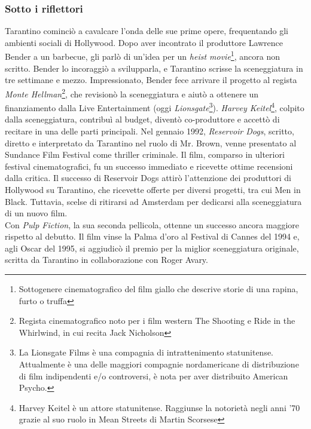 \documentclass[12pt]{article} %
\begin{document}
\subsubsection{Sotto i riflettori}
\begin{flushleft}
    Tarantino cominciò a cavalcare l'onda delle sue prime opere, frequentando gli ambienti sociali di Hollywood.
    Dopo aver incontrato il produttore Lawrence Bender a un barbecue, gli parlò di un'idea 
    per un \textit{heist movie}\footnote{Sottogenere cinematografico del film giallo che descrive storie di una rapina, furto o truffa}, ancora non scritto. 
    Bender lo incoraggiò a svilupparla, e Tarantino scrisse la sceneggiatura in tre settimane e mezzo.
    Impressionato, Bender fece arrivare il progetto al regista \textit{Monte Hellman}\footnote{Regista cinematografico noto per i film western The Shooting e Ride in the Whirlwind, in cui recita Jack Nicholson}, 
    che revisionò la sceneggiatura e aiutò a ottenere un finanziamento dalla Live Entertainment (oggi \textit{Lionsgate}\footnote{La Lionsgate Films è una compagnia di intrattenimento statunitense. Attualmente è una delle maggiori compagnie nordamericane di distribuzione di film indipendenti e/o controversi, è nota per aver distribuito American Psycho.}). 
    \textit{Harvey Keitel}\footnote{Harvey Keitel è un attore statunitense. Raggiunse la notorietà negli anni '70 grazie al suo ruolo in Mean Streets di Martin Scorsese}, 
    colpito dalla sceneggiatura, contribuì al budget, diventò co-produttore e accettò di recitare in una delle parti principali. 
    Nel gennaio 1992, \textit{Reservoir Dogs}, scritto, diretto e interpretato da Tarantino nel ruolo di Mr. Brown, 
    venne presentato al Sundance Film Festival come thriller criminale. 
    Il film, comparso in ulteriori festival cinematografici, fu un successo immediato e ricevette ottime recensioni dalla critica.
    Il successo di Reservoir Dogs attirò l'attenzione dei produttori di Hollywood su Tarantino, 
    che ricevette offerte per diversi progetti, tra cui Men in Black. 
    Tuttavia, scelse di ritirarsi ad Amsterdam per dedicarsi alla sceneggiatura di un nuovo film.\\\vspace{1cm}
    Con \textit{Pulp Fiction}, la sua seconda pellicola, ottenne un successo ancora maggiore rispetto al debutto. 
    Il film vinse la Palma d'oro al Festival di Cannes del 1994 e, agli Oscar del 1995, 
    si aggiudicò il premio per la miglior sceneggiatura originale, scritta da Tarantino in collaborazione con Roger Avary. 

\end{flushleft}
\end{document}
